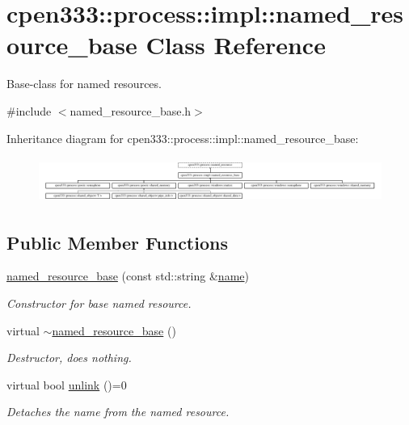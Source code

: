 \hypertarget{classcpen333_1_1process_1_1impl_1_1named__resource__base}{}\section{cpen333\+:\+:process\+:\+:impl\+:\+:named\+\_\+resource\+\_\+base Class Reference}
\label{classcpen333_1_1process_1_1impl_1_1named__resource__base}


Base-\/class for named resources.  




{\ttfamily \#include $<$named\+\_\+resource\+\_\+base.\+h$>$}

Inheritance diagram for cpen333\+:\+:process\+:\+:impl\+:\+:named\+\_\+resource\+\_\+base\+:\begin{figure}[H]
\begin{center}
\leavevmode
\includegraphics[height=1.493333cm]{classcpen333_1_1process_1_1impl_1_1named__resource__base}
\end{center}
\end{figure}
\subsection*{Public Member Functions}
\begin{DoxyCompactItemize}
\item 
\hyperlink{classcpen333_1_1process_1_1impl_1_1named__resource__base_a5f6f8b6daec88189a041de4c60ad4518}{named\+\_\+resource\+\_\+base} (const std\+::string \&\hyperlink{classcpen333_1_1process_1_1impl_1_1named__resource__base_ae0c5fbb1843afe863cece4b51c38f807}{name})
\begin{DoxyCompactList}\small\item\em Constructor for base named resource. \end{DoxyCompactList}\item 
\mbox{\label{classcpen333_1_1process_1_1impl_1_1named__resource__base_ae53d159d6c0d58a37ce8091aa132e11b}} 
virtual \hyperlink{classcpen333_1_1process_1_1impl_1_1named__resource__base_ae53d159d6c0d58a37ce8091aa132e11b}{$\sim$named\+\_\+resource\+\_\+base} ()
\begin{DoxyCompactList}\small\item\em Destructor, does nothing. \end{DoxyCompactList}\item 
virtual bool \hyperlink{classcpen333_1_1process_1_1impl_1_1named__resource__base_ae4033f82dfd068b917a9bca57d3a0c45}{unlink} ()=0
\begin{DoxyCompactList}\small\item\em Detaches the name from the named resource. \end{DoxyCompactList}\end{DoxyCompactItemize}
